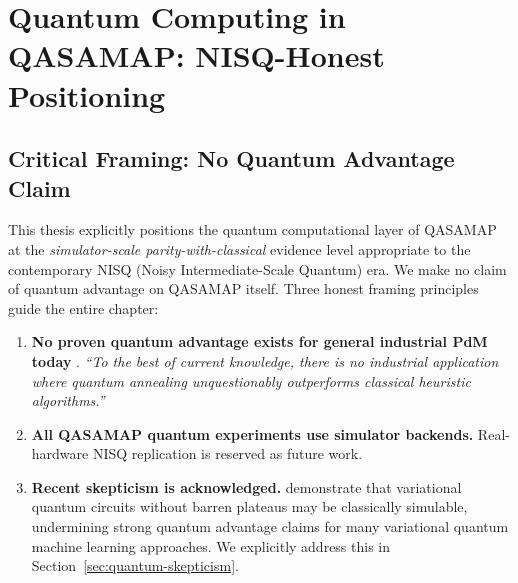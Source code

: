 %
%

\section{Quantum Computing in QASAMAP: NISQ-Honest Positioning}

\subsection{Critical Framing: No Quantum Advantage Claim}

This thesis explicitly positions the quantum computational layer of QASAMAP at the \emph{simulator-scale parity-with-classical} evidence level appropriate to the contemporary NISQ (Noisy Intermediate-Scale Quantum) era. We make no claim of quantum advantage on QASAMAP itself. Three honest framing principles guide the entire chapter:

\begin{enumerate}
    \item \textbf{No proven quantum advantage exists for general industrial PdM today} \cite{cerezo2025bp,arxiv2312_09121}. \emph{``To the best of current knowledge, there is no industrial application where quantum annealing unquestionably outperforms classical heuristic algorithms.''}
    \item \textbf{All QASAMAP quantum experiments use simulator backends.} Real-hardware NISQ replication is reserved as future work.
    \item \textbf{Recent skepticism is acknowledged.} \cite{cerezo2025bp} demonstrate that variational quantum circuits without barren plateaus may be classically simulable, undermining strong quantum advantage claims for many variational quantum machine learning approaches. We explicitly address this in Section~\ref{sec:quantum-skepticism}.
\end{enumerate}

